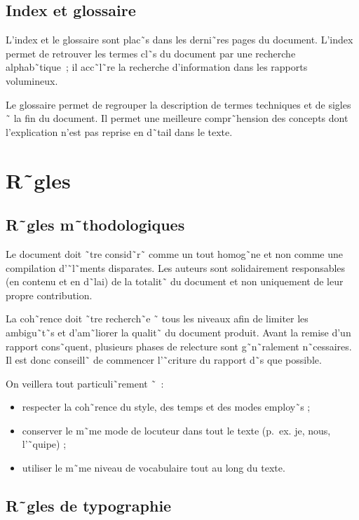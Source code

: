 \subsection{Index et glossaire}

L'index et le glossaire sont plac˜s dans les derni˜res pages du
document. L'index permet de retrouver les termes cl˜s du document par une
recherche alphab˜tique~; il acc˜l˜re la recherche d'information dans les
rapports volumineux.

Le glossaire permet de regrouper la description de termes techniques et de
sigles ˜ la fin du document. Il permet une meilleure compr˜hension des
concepts dont l'explication n'est pas reprise en d˜tail dans le texte.

\section{R˜gles}
\label{sec:regles}

\subsection{R˜gles m˜thodologiques}

Le document doit ˜tre consid˜r˜ comme un tout homog˜ne et non comme
une compilation d'˜l˜ments disparates. Les auteurs sont solidairement
responsables (en contenu et en d˜lai) de la totalit˜ du document et
non uniquement de leur propre contribution.

La coh˜rence doit ˜tre recherch˜e ˜ tous les niveaux afin de limiter
les ambigu˜t˜s et d'am˜liorer la qualit˜ du document produit. Avant la remise
d'un rapport cons˜quent, plusieurs phases de relecture sont g˜n˜ralement
n˜cessaires. Il est donc conseill˜ de commencer l'˜criture du rapport d˜s que
possible. 

On veillera tout particuli˜rement ˜~:
\begin{itemize}
\item respecter la coh˜rence du style, des  temps et des modes employ˜s ;
\item conserver le m˜me mode de locuteur dans tout le texte (p.~ex.
  je, nous, l'˜quipe) ;
\item utiliser le m˜me niveau de vocabulaire tout au long du texte. 
\end{itemize}

\subsection{R˜gles de typographie}

